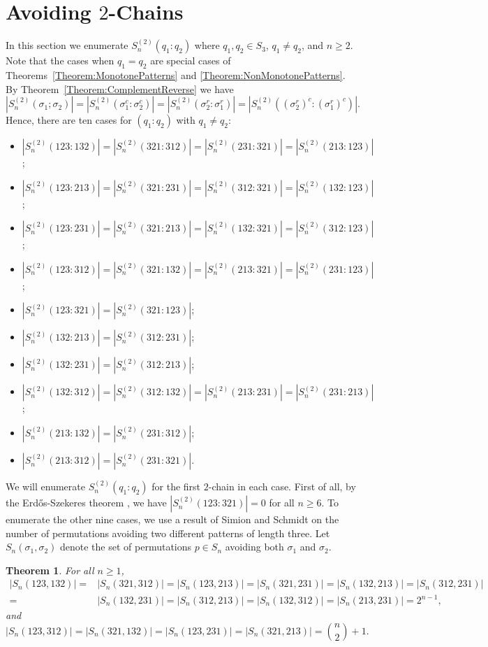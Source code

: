 \documentclass[11pt]{article}
\newtheorem{theorem}{Theorem}[section]
\theoremstyle{definition}
\numberwithin{equation}{section}
\begin{document}
\section{Avoiding $2$-Chains}\label{Section:2Chain}
In this section we enumerate $S_n^{(2)}(q_1:q_2)$ where $q_1,q_2\in S_3$, $q_1\neq q_2$, and $n\geq2$. Note that the cases when $q_1=q_2$ 
are special cases of Theorems~\ref{Theorem:MonotonePatterns} and \ref{Theorem:NonMonotonePatterns}. By Theorem~\ref{Theorem:ComplementReverse} we have \[|S_n^{(2)}(\sigma_1;\sigma_2)|=|S_n^{(2)}(\sigma_1^c:\sigma_2^c)|=|S_n^{(2)}(\sigma_2^r:\sigma_1^r)|=|S_n^{(2)}((\sigma_2^r)^c:(\sigma_1^r)^c)|.\] 
Hence, there are ten cases for $(q_1:q_2)$ with $q_1\neq q_2$:
\begin{itemize}
    \item $|S_n^{(2)}(123:132)|=|S_n^{(2)}(321:312)|=|S_n^{(2)}(231:321)|=|S_n^{(2)}(213:123)|$;
    \item $|S_n^{(2)}(123:213)|=|S_n^{(2)}(321:231)|=|S_n^{(2)}(312:321)|=|S_n^{(2)}(132:123)|$;
    \item $|S_n^{(2)}(123:231)|=|S_n^{(2)}(321:213)|=|S_n^{(2)}(132:321)|=|S_n^{(2)}(312:123)|$;
    \item $|S_n^{(2)}(123:312)|=|S_n^{(2)}(321:132)|=|S_n^{(2)}(213:321)|=|S_n^{(2)}(231:123)|$;
    \item $|S_n^{(2)}(123:321)|=|S_n^{(2)}(321:123)|$;
    \item $|S_n^{(2)}(132:213)|=|S_n^{(2)}(312:231)|$;
    \item $|S_n^{(2)}(132:231)|=|S_n^{(2)}(312:213)|$;
    \item $|S_n^{(2)}(132:312)|=|S_n^{(2)}(312:132)|=|S_n^{(2)}(213:231)|=|S_n^{(2)}(231:213)|$;
    \item $|S_n^{(2)}(213:132)|=|S_n^{(2)}(231:312)|$;
    \item $|S_n^{(2)}(213:312)|=|S_n^{(2)}(231:321)|$.
\end{itemize}

We will enumerate $S_n^{(2)}(q_1:q_2)$ for the first $2$-chain in each case. First of all, by the Erd\H{o}s-Szekeres theorem \cite[p. 467]{ErdosSzekeres1935}, we have $|S_n^{(2)}(123:321)|=0$ for all $n\geq6$. To enumerate the other nine cases, 
we use a result of Simion and Schmidt \cite{SimionSchmidt1985} on the number of permutations avoiding two different patterns of length three. 
Let
$S_n(\sigma_1,\sigma_2)$ denote the set of permutations $p\in S_n$ avoiding both $\sigma_1$ and $\sigma_2$.
\begin{theorem}{\rm\cite[Section 3]{SimionSchmidt1985}}\label{Theorem:Pairs3}
For all $n\geq1$,
    \[
   \begin{split}
|S_n(123,132)|=&|S_n(321,312)|=|S_n(123,213)|=|S_n(321,231)|=|S_n(132,213)|=|S_n(312,231)|\\=&|S_n(132,231)|=|S_n(312,213)|=|S_n(132,312)|=|S_n(213,231)|=2^{n-1},
   \end{split} 
    \]
    and
    \[
    |S_n(123,312)|=|S_n(321,132)|=|S_n(123,231)|=|S_n(321,213)|=\binom{n}{2}+1.
    \]
\end{theorem}
\end{document}
